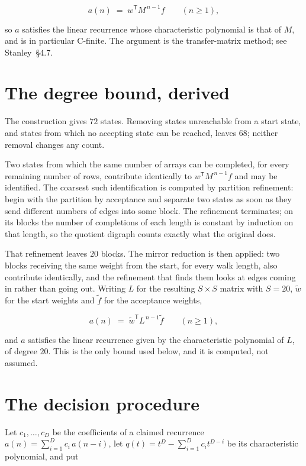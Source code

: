 \documentclass[11pt]{article}
\theoremstyle{definition}
\begin{document}
\[a(n) \;=\; w^{\mathsf T} M^{\,n-1} f \qquad (n \ge 1),\]

so $a$ satisfies the linear recurrence whose characteristic polynomial is that of $M$, and is in particular C-finite. The argument is the transfer-matrix method; see Stanley~\S4.7.

\section{The degree bound, derived}

The construction gives $72$ states. Removing states unreachable from a start state, and states from which no accepting state can be reached, leaves $68$; neither removal changes any count.

Two states from which the same number of arrays can be completed, for every remaining number of rows, contribute identically to $w^{\mathsf T}M^{\,n-1}f$ and may be identified. The coarsest such identification is computed by partition refinement: begin with the partition by acceptance and separate two states as soon as they send different numbers of edges into some block. The refinement terminates; on its blocks the number of completions of each length is constant by induction on that length, so the quotient digraph counts exactly what the original does.

That refinement leaves $20$ blocks. The mirror reduction is then applied: two blocks receiving the same weight from the start, for every walk length, also contribute identically, and the refinement that finds them looks at edges coming in rather than going out. Writing $L$ for the resulting $S \times S$ matrix with $S = 20$, $\tilde w$ for the start weights and $\tilde f$ for the acceptance weights,

\[a(n) \;=\; \tilde w^{\mathsf T} L^{\,n-1} \tilde f \qquad (n \ge 1),\]

and $a$ satisfies the linear recurrence given by the characteristic polynomial of $L$, of degree $20$. This is the only bound used below, and it is computed, not assumed.

\section{The decision procedure}

Let $c_1,\dots,c_D$ be the coefficients of a claimed recurrence $a(n) = \sum_{i=1}^{D} c_i\,a(n-i)$, let $q(t) = t^{D} - \sum_{i=1}^{D} c_i t^{D-i}$ be its characteristic polynomial, and put
\end{document}
